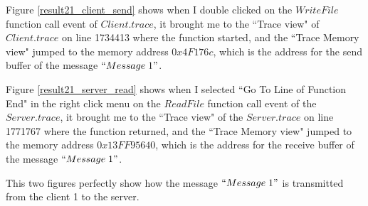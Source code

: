 Figure \ref{result21_client_send} shows when I double clicked on the $WriteFile$ function call event of $Client.trace$, it brought me to the ``Trace view" of $Client.trace$ on line 1734413 where the function started, and the ``Trace Memory view" jumped to the memory address $0x4F176c$, which is the address for the send buffer of the message $``Message\; 1"$.

Figure \ref{result21_server_read} shows when I selected ``Go To Line of Function End" in the right click menu on the $ReadFile$ function call event of the $Server.trace$, it brought me to the ``Trace view" of the $Server.trace$ on line 1771767 where the function returned, and the ``Trace Memory view" jumped to the memory address $0x13FF95640$, which is the address for the receive buffer of the message $``Message\; 1"$.

This two figures perfectly show how the message $``Message\; 1"$ is transmitted from the client 1 to the server.

